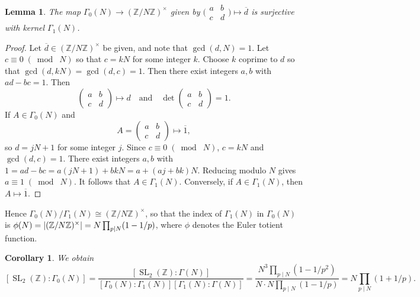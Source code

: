 \documentclass[10pt,leqno,twoside,b5paper]{article}
\theoremstyle{plain}
\newtheorem{lemma}[lem]{Lemma}
\newtheorem{corollary}[lem]{Corollary}
\theoremstyle{definition}
\numberwithin{equation}{section}
\numberwithin{lem}{section}
\DeclareMathOperator{\SL}{SL}
\newcommand{\smod}[1]{\;(\bmod\; #1)}
\newcommand{\smallabcd}{\big(\!\begin{smallmatrix}
    a & b \\ c & d
\end{smallmatrix}\!\big)}
\newcommand{\slz}{\SL_2(\mathbb{Z})}
\begin{document}
\begin{lemma}\label{lem: gamma 1 normal in gamma 0}
    The map $\varGamma_0(N)\to (\mathbb{Z}/N\mathbb{Z})^\times$ given by $\smallabcd\mapsto \overline d$ 
    is surjective with kernel $\varGamma_1(N)$.
\end{lemma}
\begin{proof}
    Let $\overline d \in (\mathbb{Z}/N\mathbb{Z})^\times$ be given, and note that $\gcd(d,N)=1$. Let $c \equiv 0\smod N$ so that $c=kN$ for some integer $k$. Choose $k$ coprime to $d$ so that $\gcd(d,kN) = \gcd(d,c) = 1$. Then there exist integers $a,b$ with $ad-bc = 1$. Then \[\begin{pmatrix}
        a & b \\ c & d
    \end{pmatrix}\mapsto d\quad\text{and}\quad \det\begin{pmatrix}
        a & b \\ c & d
    \end{pmatrix} = 1.\] 
    If $A\in \varGamma_0(N)$ and \[A = \begin{pmatrix}
        a & b \\ c & d
    \end{pmatrix}\mapsto \overline 1,\] so $d = jN+1$ for some integer $j$. Since $c\equiv 0\smod N$, $c= kN$ and $\gcd(d,c) = 1$. There exist integers $a,b$ with $1 = ad-bc = a(jN+1) + bkN = a+ (aj + bk)N$. Reducing modulo $N$ gives $a\equiv 1\smod N$. It follows that $A\in \varGamma_1(N)$. Conversely, if $A\in \varGamma_1(N)$, then $A\mapsto \overline 1$.
\end{proof}
Hence $\varGamma_0(N)/\varGamma_1(N)\cong (\mathbb{Z}/N\mathbb{Z})^\times$, so that the index of $\varGamma_1(N)$ in $\varGamma_0(N)$ is $\phi(N) = \abs{(\mathbb{Z}/N\mathbb{Z})^\times} = N\prod_{p\mid N}(1-1/p)$, where $\phi$ denotes the Euler totient function. 
\begin{corollary}
    We obtain \[[\slz : \varGamma_0(N)] = \frac{[\slz : \varGamma(N)]}{[\varGamma_0(N) : \varGamma_1(N)][\varGamma_1(N) : \varGamma(N)]} = \frac{N^3\prod_{p\mid N}(1-1/p^2)}{N\cdot N\prod_{p\mid N}(1-1/p)} = N\prod_{p\mid N}(1+1/p).\]
\end{corollary} 
\end{document}
